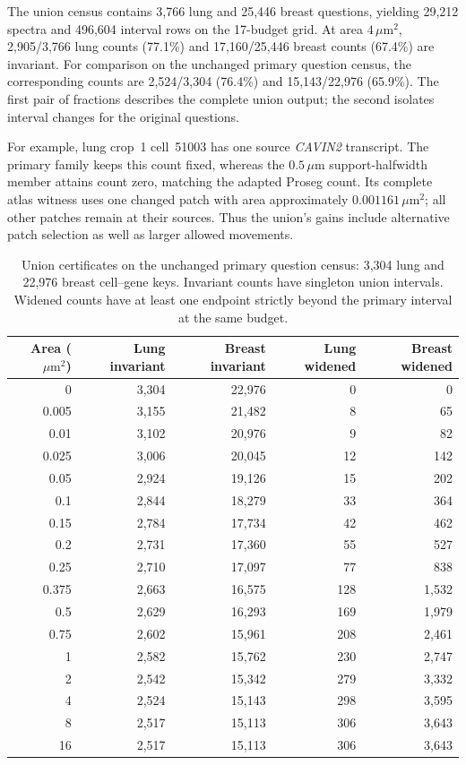 \documentclass[10pt,letterpaper]{article}
\begin{document}
The union census contains 3,766 lung and 25,446 breast questions, yielding 29,212 spectra and 496,604 interval rows on the 17-budget grid. At area $4\,\mu\mathrm m^2$, 2,905/3,766 lung counts (77.1\%) and 17,160/25,446 breast counts (67.4\%) are invariant. For comparison on the unchanged primary question census, the corresponding counts are 2,524/3,304 (76.4\%) and 15,143/22,976 (65.9\%). The first pair of fractions describes the complete union output; the second isolates interval changes for the original questions.

For example, lung crop~1 cell~51003 has one source \textit{CAVIN2} transcript. The primary family keeps this count fixed, whereas the $0.5\,\mu\mathrm m$ support-halfwidth member attains count zero, matching the adapted Proseg count. Its complete atlas witness uses one changed patch with area approximately $0.001161\,\mu\mathrm m^2$; all other patches remain at their sources. Thus the union's gains include alternative patch selection as well as larger allowed movements.

\begin{table}[ht]\centering
\begin{tabular}{rrrrr}\toprule
Area ($\mu\mathrm m^2$)&Lung invariant&Breast invariant&Lung widened&Breast widened\\\midrule
0&3,304&22,976&0&0\\
0.005&3,155&21,482&8&65\\
0.01&3,102&20,976&9&82\\
0.025&3,006&20,045&12&142\\
0.05&2,924&19,126&15&202\\
0.1&2,844&18,279&33&364\\
0.15&2,784&17,734&42&462\\
0.2&2,731&17,360&55&527\\
0.25&2,710&17,097&77&838\\
0.375&2,663&16,575&128&1,532\\
0.5&2,629&16,293&169&1,979\\
0.75&2,602&15,961&208&2,461\\
1&2,582&15,762&230&2,747\\
2&2,542&15,342&279&3,332\\
4&2,524&15,143&298&3,595\\
8&2,517&15,113&306&3,643\\
16&2,517&15,113&306&3,643\\
\bottomrule\end{tabular}
\caption{Union certificates on the unchanged primary question census: 3,304 lung and 22,976 breast cell--gene keys. Invariant counts have singleton union intervals. Widened counts have at least one endpoint strictly beyond the primary interval at the same budget.}\label{tab:union-budgets}
\end{table}
\end{document}

